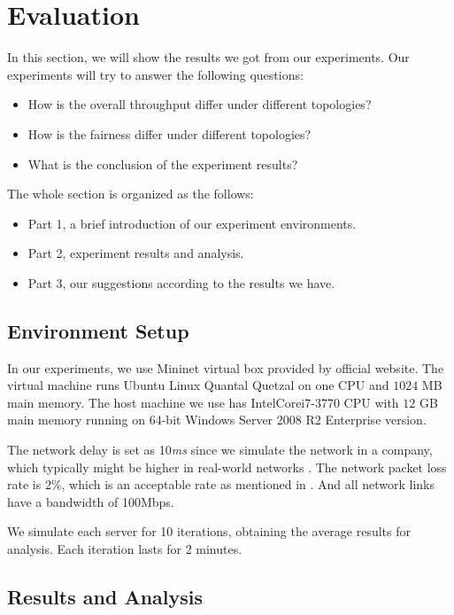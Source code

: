 \section{Evaluation} \label{sec:evaluation}

In this section, we will show the results we got from our experiments. Our experiments will try to 
answer the following questions:
\begin{itemize}
    \item How is the overall throughput differ under different topologies?
    \item How is the fairness differ under different topologies?
    \item What is the conclusion of the experiment results?
\end{itemize}

The whole section is organized as the follows:
\begin{itemize}
    \item Part 1, a brief introduction of our experiment environments.
    \item Part 2, experiment results and analysis.
    \item Part 3, our suggestions according to the results we have.
\end{itemize}

\subsection{Environment Setup} \label{subsec:environment}
In our experiments, we use Mininet virtual box provided by official website\cite{Mininet:official}. 
The virtual machine runs Ubuntu Linux Quantal Quetzal on one CPU and $1024$ MB main memory.
The host machine we use has Intel\textregistered Core\texttrademark i7-3770 CPU with $12$ GB main memory running on
64-bit Windows Server 2008 R2 Enterprise version.

The network delay is set as 10{\it ms} since we simulate the network in a company, 
which typically might be higher in real-world networks \cite{NetworkDelay:web}. 
The network packet loss rate is 2\%, which is an acceptable rate as mentioned in \cite{PacketLoss:wiki}.
And all network links have a bandwidth of 100Mbps. 

We simulate each server for 10 iterations, obtaining the average results for 
analysis. Each iteration lasts for 2 minutes.

\subsection{Results and Analysis} \label{subsec:result}

